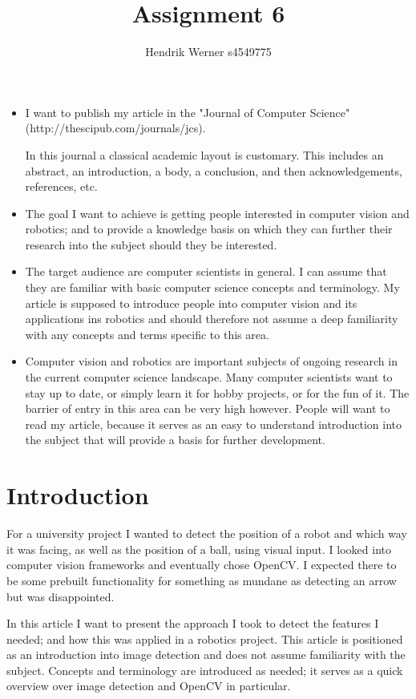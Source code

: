\documentclass[12pt, a4paper]{article}
\title{Assignment 6}
\author{Hendrik Werner s4549775}
\begin{document}
\maketitle

\begin{itemize}
	\item I want to publish my article in the "Journal of Computer Science" (http://thescipub.com/journals/jcs).

	In this journal a classical academic layout is customary. This includes an abstract, an introduction, a body, a conclusion, and then acknowledgements, references, etc.
	\item The goal I want to achieve is getting people interested in computer vision and robotics; and to provide a knowledge basis on which they can further their research into the subject should they be interested.
	\item The target audience are computer scientists in general. I can assume that they are familiar with basic computer science concepts and terminology. My article is supposed to introduce people into computer vision and its applications ins robotics and should therefore not assume a deep familiarity with any concepts and terms specific to this area.
	\item Computer vision and robotics are important subjects of ongoing research in the current computer science landscape. Many computer scientists want to stay up to date, or simply learn it for hobby projects, or for the fun of it. The barrier of entry in this area can be very high however. People will want to read my article, because it serves as an easy to understand introduction into the subject that will provide a basis for further development.
\end{itemize}

\section*{Introduction}
For a university project I wanted to detect the position of a robot and which way it was facing, as well as the position of a ball, using visual input. I looked into computer vision frameworks and eventually chose OpenCV. I expected there to be some prebuilt functionality for something as mundane as detecting an arrow but was disappointed.

In this article I want to present the approach I took to detect the features I needed; and how this was applied in a robotics project. This article is positioned as an introduction into image detection and does not assume familiarity with the subject. Concepts and terminology are introduced as needed;
it serves as a quick overview over image detection and OpenCV in particular.
\end{document}
